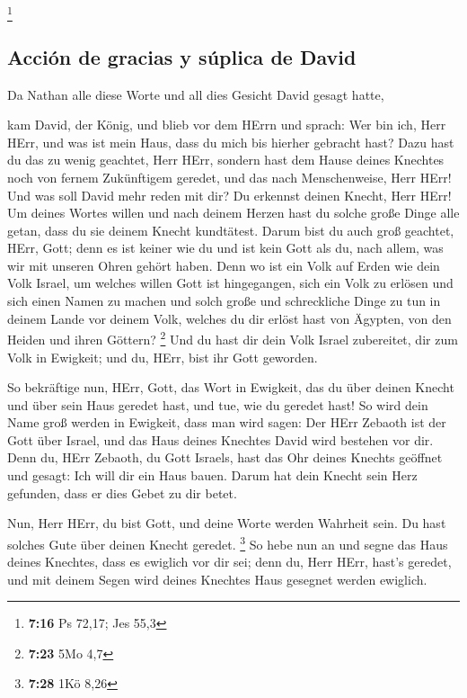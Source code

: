 \footnote{\textbf{7:16} Ps 72,17; Jes 55,3}

\hypertarget{acciuxf3n-de-gracias-y-suxfaplica-de-david}{%
\subsection{Acción de gracias y súplica de
David}\label{acciuxf3n-de-gracias-y-suxfaplica-de-david}}

 Da Nathan alle diese Worte und all dies Gesicht David
gesagt hatte,

 kam David, der König, und blieb vor dem HErrn und
sprach: Wer bin ich, Herr HErr, und was ist mein Haus, dass du mich bis
hierher gebracht hast?  Dazu hast du das zu wenig
geachtet, Herr HErr, sondern hast dem Hause deines Knechtes noch von
fernem Zukünftigem geredet, und das nach Menschenweise, Herr HErr!
 Und was soll David mehr reden mit dir? Du erkennst
deinen Knecht, Herr HErr!  Um deines Wortes willen und
nach deinem Herzen hast du solche große Dinge alle getan, dass du sie
deinem Knecht kundtätest.  Darum bist du auch groß
geachtet, HErr, Gott; denn es ist keiner wie du und ist kein Gott als
du, nach allem, was wir mit unseren Ohren gehört haben. 
Denn wo ist ein Volk auf Erden wie dein Volk Israel, um welches willen
Gott ist hingegangen, sich ein Volk zu erlösen und sich einen Namen zu
machen und solch große und schreckliche Dinge zu tun in deinem Lande vor
deinem Volk, welches du dir erlöst hast von Ägypten, von den Heiden und
ihren Göttern? \footnote{\textbf{7:23} 5Mo 4,7}  Und du
hast dir dein Volk Israel zubereitet, dir zum Volk in Ewigkeit; und du,
HErr, bist ihr Gott geworden.

 So bekräftige nun, HErr, Gott, das Wort in Ewigkeit, das
du über deinen Knecht und über sein Haus geredet hast, und tue, wie du
geredet hast!  So wird dein Name groß werden in Ewigkeit,
dass man wird sagen: Der HErr Zebaoth ist der Gott über Israel, und das
Haus deines Knechtes David wird bestehen vor dir.  Denn
du, HErr Zebaoth, du Gott Israels, hast das Ohr deines Knechts geöffnet
und gesagt: Ich will dir ein Haus bauen. Darum hat dein Knecht sein Herz
gefunden, dass er dies Gebet zu dir betet.

 Nun, Herr HErr, du bist Gott, und deine Worte werden
Wahrheit sein. Du hast solches Gute über deinen Knecht geredet.
\footnote{\textbf{7:28} 1Kö 8,26}  So hebe nun an und
segne das Haus deines Knechtes, dass es ewiglich vor dir sei; denn du,
Herr HErr, hast's geredet, und mit deinem Segen wird deines Knechtes
Haus gesegnet werden ewiglich.

